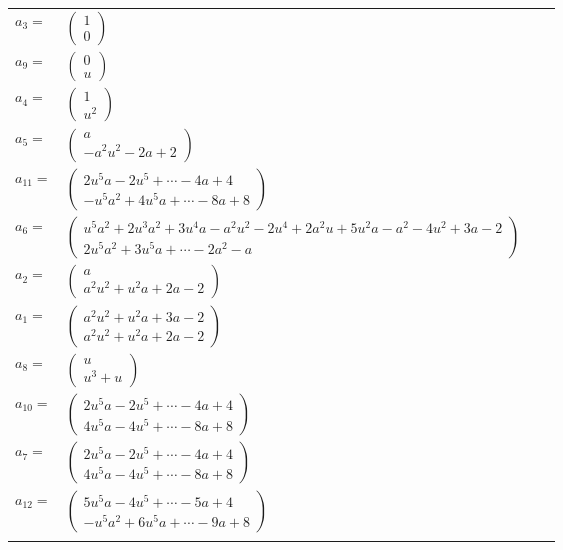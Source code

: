 \documentclass[1p]{elsarticle_modified}
\theoremstyle{definition}
\begin{document}
\begin{tabular}{m{7pt} m{180pt} m{7pt} m{180pt} }
\flushright $a_{3}=$&$\begin{pmatrix}1\\0\end{pmatrix}$ \\
\flushright $a_{9}=$&$\begin{pmatrix}0\\u\end{pmatrix}$ \\
\flushright $a_{4}=$&$\begin{pmatrix}1\\u^2\end{pmatrix}$ \\
\flushright $a_{5}=$&$\begin{pmatrix}a\\- a^2 u^2-2 a+2\end{pmatrix}$ \\
\flushright $a_{11}=$&$\begin{pmatrix}2 u^5 a-2 u^5+\cdots-4 a+4\\- u^5 a^2+4 u^5 a+\cdots-8 a+8\end{pmatrix}$ \\
\flushright $a_{6}=$&$\begin{pmatrix}u^5 a^2+2 u^3 a^2+3 u^4 a- a^2 u^2-2 u^4+2 a^2 u+5 u^2 a- a^2-4 u^2+3 a-2\\2 u^5 a^2+3 u^5 a+\cdots-2 a^2- a\end{pmatrix}$ \\
\flushright $a_{2}=$&$\begin{pmatrix}a\\a^2 u^2+u^2 a+2 a-2\end{pmatrix}$ \\
\flushright $a_{1}=$&$\begin{pmatrix}a^2 u^2+u^2 a+3 a-2\\a^2 u^2+u^2 a+2 a-2\end{pmatrix}$ \\
\flushright $a_{8}=$&$\begin{pmatrix}u\\u^3+u\end{pmatrix}$ \\
\flushright $a_{10}=$&$\begin{pmatrix}2 u^5 a-2 u^5+\cdots-4 a+4\\4 u^5 a-4 u^5+\cdots-8 a+8\end{pmatrix}$ \\
\flushright $a_{7}=$&$\begin{pmatrix}2 u^5 a-2 u^5+\cdots-4 a+4\\4 u^5 a-4 u^5+\cdots-8 a+8\end{pmatrix}$ \\
\flushright $a_{12}=$&$\begin{pmatrix}5 u^5 a-4 u^5+\cdots-5 a+4\\- u^5 a^2+6 u^5 a+\cdots-9 a+8\end{pmatrix}$\\&\end{tabular}
\end{document}
